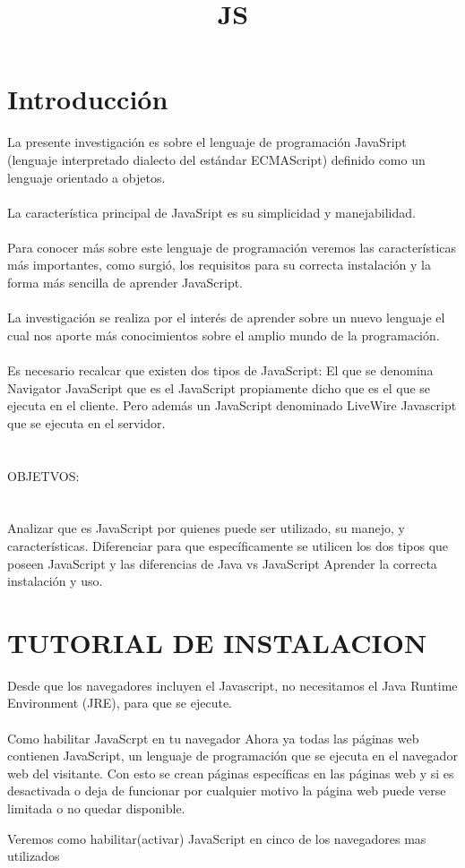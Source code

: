 \documentclass[11pt]{article} %
\title{JS}
\begin{document}
\maketitle

\section{Introducción}
La presente investigación es sobre el lenguaje de programación JavaSript  (lenguaje interpretado  dialecto del estándar ECMAScript) definido como un lenguaje orientado a objetos.\\
\\La característica principal de JavaSript es su simplicidad y manejabilidad.\\
\\Para conocer más sobre este lenguaje de programación veremos las características más importantes,  como surgió, los requisitos para su correcta instalación y la forma más sencilla de aprender JavaScript. \\
\\La investigación se realiza por el interés de aprender sobre un nuevo lenguaje el cual nos aporte más conocimientos sobre el amplio mundo de la programación.\\
\\Es necesario recalcar que existen dos tipos de JavaScript: El que se denomina Navigator JavaScript que es el JavaScript propiamente dicho que es el que se ejecuta en el cliente. Pero además un JavaScript denominado LiveWire Javascript que se ejecuta en el servidor.\\
\\ \\

OBJETVOS:
\\ \\
\\Analizar que es JavaScript por quienes puede ser utilizado, su manejo, y características.
Diferenciar para que específicamente se utilicen los dos tipos que poseen JavaScript y las diferencias de Java vs JavaScript
Aprender la correcta instalación y uso.\\

\section{TUTORIAL DE INSTALACION}
 Desde que los navegadores incluyen el Javascript, no necesitamos el Java Runtime Environment (JRE), para que se ejecute.
\\  \\
Como habilitar JavaScrpt en tu navegador 
Ahora ya todas las páginas web contienen  JavaScript, un lenguaje de programación que se ejecuta en el navegador web del visitante. Con esto se crean páginas específicas en las páginas web y si es desactivada o deja de funcionar por cualquier motivo la página web puede verse limitada o no quedar disponible.

Veremos como habilitar(activar) JavaScript en cinco de los navegadores mas utilizados



\lstset{language=Pascal}          %
\end{document}
